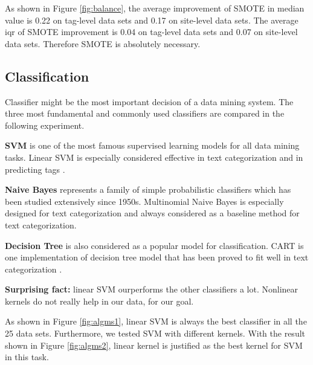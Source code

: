 \documentclass{sig-alternate-05-2015}
\begin{document}
As shown in Figure \ref{fig:balance}, the average improvement of SMOTE in median value is 0.22 on tag-level data sets and 0.17 on site-level data sets. The average iqr of SMOTE improvement is 0.04 on tag-level data sets and 0.07 on site-level data sets. Therefore SMOTE is absolutely necessary.

\subsection{Classification}

Classifier might be the most important decision of a data mining system. The three most fundamental and commonly used classifiers are compared in the following experiment.

\textbf{SVM} is one of the most famous supervised learning models for all data mining tasks. Linear SVM is especially considered effective in text categorization \cite{joachims2006training} and in predicting tags \cite{moharanatag}. 

\textbf{Naive Bayes} represents a family of simple probabilistic classifiers which has been studied extensively since 1950s. Multinomial Naive Bayes is especially designed for text categorization \cite{mccallum1998comparison} and always considered as a baseline method for text categorization. 

\textbf{Decision Tree} is also considered as a popular model for classification. CART is one implementation of decision tree model that has been proved to fit well in text categorization \cite{miotto2005supporting}.


\textbf{Surprising fact:} linear SVM ourperforms the other classifiers a lot. Nonlinear kernels do not really help in our data, for our goal.

As shown in Figure \ref{fig:algms1}, linear SVM is always the best classifier in all the 25 data sets. Furthermore, we tested SVM with different kernels. With the result shown in Figure \ref{fig:algms2}, linear kernel is justified as the best kernel for SVM in this task.

\end{document}
